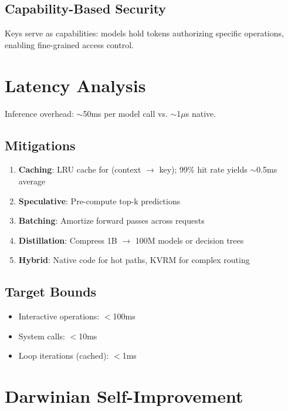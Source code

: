 \documentclass[11pt,a4paper]{article}
\begin{document}
\subsection{Capability-Based Security}

Keys serve as capabilities: models hold tokens authorizing specific operations, enabling fine-grained access control.

\section{Latency Analysis}
\label{sec:latency}

Inference overhead: $\sim$50ms per model call vs. $\sim$1$\mu$s native.

\subsection{Mitigations}

\begin{enumerate}
    \item \textbf{Caching}: LRU cache for (context $\to$ key); 99\% hit rate yields $\sim$0.5ms average
    \item \textbf{Speculative}: Pre-compute top-k predictions
    \item \textbf{Batching}: Amortize forward passes across requests
    \item \textbf{Distillation}: Compress 1B $\to$ 100M models or decision trees
    \item \textbf{Hybrid}: Native code for hot paths, KVRM for complex routing
\end{enumerate}

\subsection{Target Bounds}

\begin{itemize}
    \item Interactive operations: $<$100ms
    \item System calls: $<$10ms
    \item Loop iterations (cached): $<$1ms
\end{itemize}

\section{Darwinian Self-Improvement}
\label{sec:self-improve}
\end{document}
